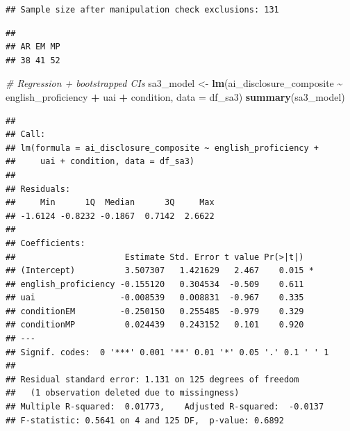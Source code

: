 \documentclass[
]{article}
\newenvironment{Shaded}{\begin{snugshade}}{\end{snugshade}}
\newcommand{\AttributeTok}[1]{\textcolor[rgb]{0.13,0.29,0.53}{#1}}
\newcommand{\CommentTok}[1]{\textcolor[rgb]{0.56,0.35,0.01}{\textit{#1}}}
\newcommand{\FunctionTok}[1]{\textcolor[rgb]{0.13,0.29,0.53}{\textbf{#1}}}
\newcommand{\NormalTok}[1]{#1}
\newcommand{\OtherTok}[1]{\textcolor[rgb]{0.56,0.35,0.01}{#1}}
\newcommand{\SpecialCharTok}[1]{\textcolor[rgb]{0.81,0.36,0.00}{\textbf{#1}}}
\begin{document}
\begin{verbatim}
## Sample size after manipulation check exclusions: 131
\end{verbatim}

\begin{Shaded}
\end{Shaded}

\begin{verbatim}
## 
## AR EM MP 
## 38 41 52
\end{verbatim}

\begin{Shaded}
\begin{Highlighting}[]
\CommentTok{\# Regression + bootstrapped CIs}
\NormalTok{sa3\_model }\OtherTok{\textless{}{-}} \FunctionTok{lm}\NormalTok{(ai\_disclosure\_composite }\SpecialCharTok{\textasciitilde{}}\NormalTok{ english\_proficiency }\SpecialCharTok{+}\NormalTok{ uai }\SpecialCharTok{+}\NormalTok{ condition,}
                \AttributeTok{data =}\NormalTok{ df\_sa3)}
\FunctionTok{summary}\NormalTok{(sa3\_model)}
\end{Highlighting}
\end{Shaded}

\begin{verbatim}
## 
## Call:
## lm(formula = ai_disclosure_composite ~ english_proficiency + 
##     uai + condition, data = df_sa3)
## 
## Residuals:
##     Min      1Q  Median      3Q     Max 
## -1.6124 -0.8232 -0.1867  0.7142  2.6622 
## 
## Coefficients:
##                      Estimate Std. Error t value Pr(>|t|)  
## (Intercept)          3.507307   1.421629   2.467    0.015 *
## english_proficiency -0.155120   0.304534  -0.509    0.611  
## uai                 -0.008539   0.008831  -0.967    0.335  
## conditionEM         -0.250150   0.255485  -0.979    0.329  
## conditionMP          0.024439   0.243152   0.101    0.920  
## ---
## Signif. codes:  0 '***' 0.001 '**' 0.01 '*' 0.05 '.' 0.1 ' ' 1
## 
## Residual standard error: 1.131 on 125 degrees of freedom
##   (1 observation deleted due to missingness)
## Multiple R-squared:  0.01773,    Adjusted R-squared:  -0.0137 
## F-statistic: 0.5641 on 4 and 125 DF,  p-value: 0.6892
\end{verbatim}
\end{document}
